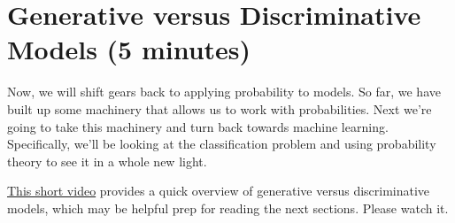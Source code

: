 \documentclass[assignment03_Solutions]{subfiles}
\begin{document}
%
%
%


\vspace{4em}

\section{Generative versus Discriminative Models (5 minutes)}
Now, we will shift gears back to applying probability to models. So far, we have built up some machinery that allows us to work with probabilities.  Next we're going to take this machinery and turn back towards machine learning.  Specifically, we'll be looking at the classification problem and using probability theory to see it in a whole new light.

\href{https://www.youtube.com/watch?v=HHNESCbZqUg}{This short video} provides a quick overview of generative versus discriminative models, which may be helpful prep for reading the next sections. Please watch it.
\end{document}
